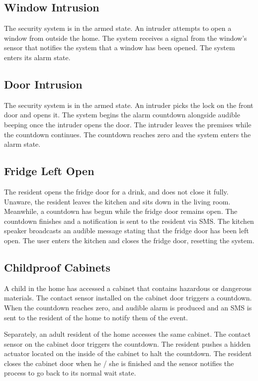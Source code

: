\documentclass{report}
\begin{document}
\subsection*{Window Intrusion}

The security system is in the armed state. An intruder attempts to open a
window from outside the home. The system receives a signal from the window's
sensor that notifies the system that a window has been opened. The system
enters its alarm state.

\subsection*{Door Intrusion}

The security system is in the armed state. An intruder picks the lock on the
front door and opens it.  The system begins the alarm countdown alongside
audible beeping once the intruder opens the door.  The intruder leaves the
premises while the countdown continues. The countdown reaches zero and the
system enters the alarm state.

\subsection*{Fridge Left Open}

The resident opens the fridge door for a drink, and does not close it fully.
Unaware, the resident leaves the kitchen and sits down in the living room.
Meanwhile, a countdown has begun while the fridge door remains open. The
countdown finishes and a notification is sent to the resident via SMS. The
kitchen speaker broadcasts an audible message stating that the fridge door has
been left open. The user enters the kitchen and closes the fridge door,
resetting the system. 

\subsection*{Childproof Cabinets}

A child in the home has accessed a cabinet that contains hazardous or dangerous
materials. The contact sensor installed on the cabinet door triggers a
countdown. When the countdown reaches zero, and audible alarm is produced and
an SMS is sent to the resident of the home to notify them of the event.

Separately, an adult resident of the home accesses the same cabinet. The
contact sensor on the cabinet door triggers the countdown. The resident pushes
a hidden actuator located on the inside of the cabinet to halt the countdown.
The resident closes the cabinet door when he / she is finished and the sensor
notifies the process to go back to its normal wait state.
\end{document}
